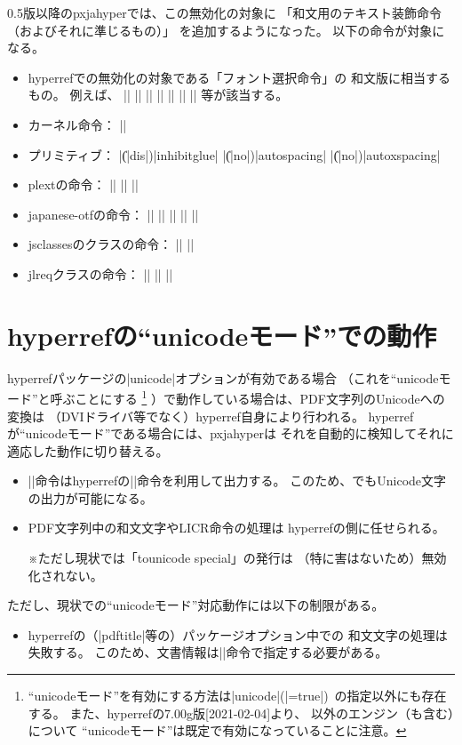 \documentclass[uplatex,dvipdfmx,a4paper]{jsarticle}
\renewcommand{\headfont}{\gtfamily\romanseries{sbc}\sffamily}
\newcommand{\Pkg}[1]{\textsf{#1}}
\newcommand{\Note}{\par\noindent ※}
\newcommand{\Means}{：\quad}
\providecommand{\Strong}[1]{{\headfont#1}}
\begin{document}
0.5版以降の\Pkg{pxjahyper}では、この無効化の対象に
「和文用のテキスト装飾命令（およびそれに準じるもの）」
を追加するようになった。
以下の命令が対象になる。

\begin{itemize}
\item \Pkg{hyperref}での無効化の対象である「フォント選択命令」の
  和文版に相当するもの。
  例えば、
  |\textmc| |\gtfamily| |\kanjifamily| |\romanshape|
  |\usekanji| |\useroman| |\userelfont|
  等が該当する。
\item {\pLaTeX}カーネル命令\Means
  |\<|
\item {\pTeX}プリミティブ\Means
  |\|(|dis|)|inhibitglue| |\|(|no|)|autospacing| |\|(|no|)|autoxspacing|
\item \Pkg{plext}の命令\Means
  |\bou| |\kasen| |\rensuji|
\item \Pkg{japanese-otf}の命令\Means
  |\textmg| |\mgfamily| |\ltseries| |\ebseries| |\propshape|
\item \Pkg{jsclasses}のクラスの命令\Means
  |\maybeblue| |\HUGE|
\item \Pkg{jlreq}クラスの命令\Means
  |\jafontsize| |\tatechuyoko| |\jidori| %
\end{itemize}

\section{hyperrefの“unicodeモード”での動作}
\label{sec:Unicode-mode}

\Pkg{hyperref}パッケージの|unicode|オプションが有効である場合
（これを“unicodeモード”と呼ぶことにする
\footnote{“unicodeモード”を有効にする方法は|unicode|(|=true|)\,%
  の指定以外にも存在する。
  また、\Pkg{hyperref}の7.00g版[2021-02-04]より、
  {\pLaTeX}以外のエンジン（\Strong{{\upLaTeX}も含む}）について
  “unicodeモード”は既定で有効になっていることに注意。}%
）で動作している場合は、PDF文字列のUnicodeへの変換は
（DVIドライバ等でなく）\Pkg{hyperref}自身により行われる。
\Pkg{hyperref}が“unicodeモード”である場合には、\Pkg{pxjahyper}は
それを自動的に検知してそれに適応した動作に切り替える。
\begin{itemize}
\item |\Ux|命令は\Pkg{hyperref}の|\unichar|命令を利用して出力する。
  このため、{\pLaTeX}でもUnicode文字の出力が可能になる。
\item PDF文字列中の和文文字やLICR命令の処理は
  \Pkg{hyperref}の側に任せられる。
  \Note ただし現状では「tounicode special」の発行は
  （特に害はないため）無効化されない。
\end{itemize}
ただし、現状での“unicodeモード”対応動作には以下の制限がある。
\begin{itemize}
\item \Pkg{hyperref}の（|pdftitle|等の）パッケージオプション中での
  和文文字の処理は失敗する。
  このため、文書情報は|\hypersetup|命令で指定する必要がある。
\end{itemize}
\end{document}
